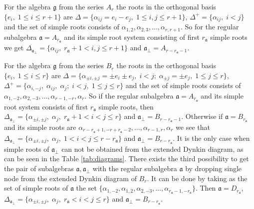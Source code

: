 \documentclass[a4paper,12pt]{article}
\theoremstyle{definition} \newtheorem{Def}{Definition}
\begin{document}
For the algebra $\mathfrak{g}$ from the series $A_r$ the roots in the orthogonal basis $\{e_i,\; 1\leq i\leq r+1\}$ are $\Delta=\{\alpha_{ i j}= e_i- e_j,\; 1\leq i, j\leq r+1\}$, $\Delta^{+}=\{\alpha_{ij},\; i<j\}$ and the set of simple roots consists of $\alpha_{1,2},\alpha_{2,3},\dots,\alpha_{r,r+1}$. So for the regular subalgebra $\mathfrak{a}=A_{r_{\mathfrak{a}}}$ and its simple root system consisting of first $r_{\mathfrak{a}}$ simple roots we get $\Delta_{\mathfrak{a}_{\bot}}=\{\alpha_{ i j},\; r_{\mathfrak{a}}+1<i,j\leq r+1\}$ and $\mathfrak{a}_{\bot}=A_{r-r_{\mathfrak{a}}-1}$.

For the algebra $\mathfrak{g}$ from the series $B_r$ the roots in the orthogonal basis $\{e_i,\; 1\leq i\leq r\}$ are $\Delta=\{\alpha_{\pm i,\pm j}=\pm e_i\pm e_j,\;i<j;\; \alpha_{\pm j}=\pm e_{ j},\; 1\leq j\leq r\}$, $\Delta^{+}=\{\alpha_{i,-j},\; \alpha_{ij},\; \alpha_j;\; i<j,\; 1\leq j\leq r\}$ and the set of simple roots consists of $\alpha_{1,-2},\alpha_{2,-3},\dots,\alpha_{r-1,-r},\alpha_r$. So if the regular subalgebra $\mathfrak{a}=A_{r_{\mathfrak{a}}}$ and its simple root system consists of first $r_{\mathfrak{a}}$ simple roots, then $\Delta_{\mathfrak{a}_{\bot}}=\{\alpha_{\pm i,\pm j},\;\alpha_j,\; r_{\mathfrak{a}}+1<i<j\leq r\}$ and $\mathfrak{a}_{\bot}=B_{r-r_{\mathfrak{a}}-1}$. Otherwise if $\mathfrak{a}=B_{r_{\mathfrak{a}}}$ and its simple roots are $\alpha_{r-r_{\mathfrak{a}}+1,-r+r_{\mathfrak{a}}-2},\dots,\alpha_{r-1,r},\alpha_r$ we see that $\Delta_{\mathfrak{a}_{\bot}}=\{\alpha_{\pm i,\pm j},\;\alpha_j,\; 1<i<j\leq r-r_{\mathfrak{a}}\}$ and $\mathfrak{a}_{\bot}=B_{r-r_{\mathfrak{a}}}$. It is the only case when simple roots of $\mathfrak{a}_{\bot}$ can not be obtained from the extended Dynkin diagram, as can be seen in the Table \ref{tab:diagrams}. 
There exists the third possibility to get the pair of subalgebras $\mathfrak{a},\mathfrak{a}_{\bot}$ with the regular subalgebra $\mathfrak{a}$ by dropping single node from the extended Dynkin diagram of $B_r$. It can be done by taking as the set of simple roots of $\mathfrak{a}$ the set $\{\alpha_{1,-2},\alpha_{1,2},\alpha_{2,-3},\dots,\alpha_{r_{\mathfrak{a}}-1,-r_{\mathfrak{a}}}\}$. Then $\mathfrak{a}=D_{r_{\mathfrak{a}}}$, $\Delta_{\mathfrak{a}_{\bot}}=\{\alpha_{\pm i,\pm j},\;\alpha_j,\; r_{\mathfrak{a}}<i<j\leq r\}$ and $\mathfrak{a}_{\bot}=B_{r-r_{\mathfrak{a}}}$.
\end{document}
